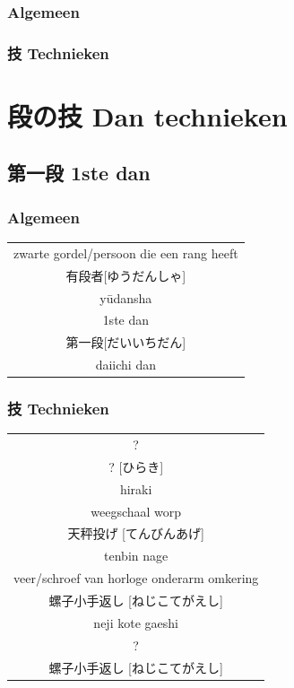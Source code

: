 \documentclass[12pt]{scrartcl}
\begin{document}
\begin{CJK*}{UTF8}{min}
\subsubsection{Algemeen}
\subsubsection{技 Technieken}

\newpage
\section{段の技 Dan technieken}
\subsection{第一段 1ste dan}
\subsubsection{Algemeen}
\begin{table}[H]
\begin{center}
\begin{tabular}{c}
zwarte gordel/persoon die een rang heeft\\
有段者[ゆうだんしゃ]\\
y\={u}dansha\\
\hline
1ste dan\\
第一段[だいいちだん]\\
daiichi dan
\end{tabular}
\end{center}
\label{dan_1_gen}
\end{table}

\subsubsection{技 Technieken}
\begin{table}[H]
\begin{center}
\begin{tabular}{c}
?\\
? [ひらき]\\
hiraki\\
\hline
weegschaal worp\\
天秤投げ [てんびんあげ]\\
tenbin nage\\
\hline
veer/schroef van horloge onderarm omkering\\
螺子小手返し [ねじこてがえし]\\
neji kote gaeshi\\
\hline
?\\
螺子小手返し [ねじこてがえし]\\
\end{tabular}
\end{center}
\label{dan_1}
\end{table}


\end{CJK*}
\end{document}
